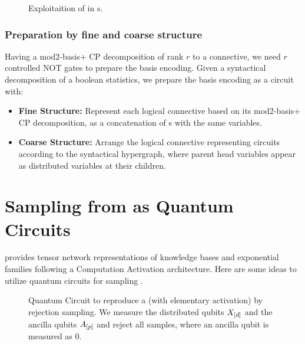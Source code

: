 \documentclass[aps,onecolumn,nofootinbib,pra]{article}
\begin{document}
    \begin{figure}
        \begin{center}
            
        \end{center}
        \caption{
            Exploitaition of \PolynomialSparsity{} in \computationCircuit{}s.
        }\label{fig:qcbencodingPolynomial}
    \end{figure}

    \subsubsection{Preparation by fine and coarse structure}

    Having a mod2-basis+ CP decomposition of rank $r$ to a connective, we need $r$ controlled NOT gates to prepare the basis encoding.
    Given a syntactical decomposition of a boolean statistics, we prepare the basis encoding as a circuit with:
    \begin{itemize}
        \item \textbf{Fine Structure:} Represent each logical connective based on its mod2-basis+ CP decomposition, as a concatenation of \computationCircuit{}s with the same variables.
        \item \textbf{Coarse Structure:} Arrange the logical connective representing circuits according to the syntactical hypergraph, where parent head variables appear as distributed variables at their children.
    \end{itemize}


    \section{Sampling from \ComputationActivationNetworks{} as Quantum Circuits}

    \tnreason{} provides tensor network representations of knowledge bases and exponential families following a Computation Activation architecture.
    Here are some ideas to utilize quantum circuits for sampling \ComputationActivationNetworks{}.

    \begin{figure}
        \begin{center}
            
        \end{center}
        \caption{
            Quantum Circuit to reproduce a \ComputationActivationNetwork{} (with elementary activation) by rejection sampling.
            We measure the distributed qubits $X_{[d]}$ and the ancilla qubits $A_{[p]}$ and reject all samples, where an ancilla qubit is measured as $0$.
        }
    \end{figure}
\end{document}

